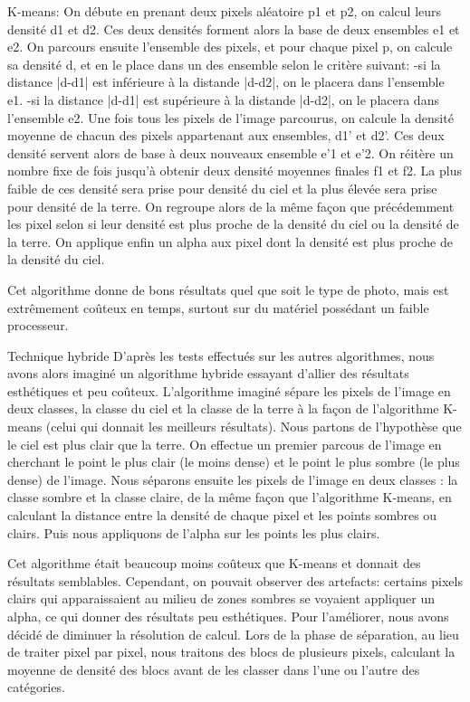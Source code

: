 \documentclass{report}
\begin{document}
K-means:
On débute en prenant deux pixels aléatoire p1 et p2, on calcul leurs densité d1 et d2. Ces deux densités forment alors la base de deux ensembles e1 et e2. On parcours ensuite l’ensemble des pixels, et pour chaque pixel p, on calcule sa densité d, et en le place dans un des ensemble selon le critère suivant:
	-si la distance |d-d1| est inférieure à la distande |d-d2|, on le placera dans l’ensemble e1.
	-si la distance |d-d1| est supérieure à la distande |d-d2|, on le placera dans l’ensemble e2.
Une fois tous les pixels de l’image parcourus, on calcule la densité moyenne de chacun des pixels appartenant aux ensembles, d1’ et d2’. Ces deux densité servent alors de base à deux nouveaux ensemble e’1 et e’2. On réitère un nombre fixe de fois jusqu’à obtenir deux densité moyennes finales f1 et f2. La plus faible de ces densité sera prise pour densité du ciel et la plus élevée sera prise pour densité de la terre. On regroupe alors de la même façon que précédemment les pixel selon si leur densité est plus proche de la densité du ciel ou la densité de la terre. On applique enfin un alpha aux pixel dont la densité est plus proche de la densité du ciel.

Cet algorithme donne de bons résultats quel que soit le type de photo, mais est extrêmement coûteux en temps, surtout sur du matériel possédant un faible processeur.

Technique hybride
D’après les tests effectués sur les autres algorithmes, nous avons alors imaginé un algorithme hybride essayant d’allier des résultats esthétiques et peu coûteux.
L’algorithme imaginé sépare les pixels de l’image en deux classes, la classe du ciel et la classe de la terre à la façon de l’algorithme K-means (celui qui donnait les meilleurs résultats). Nous partons de l’hypothèse que le ciel est plus clair que la terre. On effectue un premier parcous de l’image en cherchant le point le plus clair (le moins dense) et le point le plus sombre (le plus dense) de l’image. Nous séparons ensuite les pixels de l’image en deux classes : la classe sombre et la classe claire, de la même façon que l’algorithme K-means, en calculant la distance entre la densité de chaque pixel et les points sombres ou clairs. Puis nous appliquons de l’alpha sur les points les plus clairs.

Cet algorithme était beaucoup moins coûteux que K-means et donnait des résultats semblables.
Cependant, on pouvait observer des artefacts: certains pixels clairs qui apparaissaient au milieu de zones sombres se voyaient appliquer un alpha, ce qui donner des résultats peu esthétiques. Pour l’améliorer, nous avons décidé de diminuer la résolution de calcul. Lors de la phase de séparation, au lieu de traiter pixel par pixel, nous traitons des blocs de plusieurs pixels, calculant la moyenne de densité des blocs avant de les classer dans l’une ou l’autre des catégories.
\end{document}
